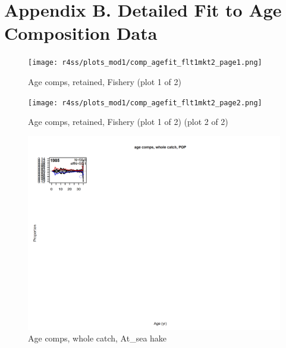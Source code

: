 \documentclass[12pt,]{article}
\begin{document}
\FloatBarrier

\section{Appendix B. Detailed Fit to Age Composition
Data}\label{appendix-b.-detailed-fit-to-age-composition-data}

\begin{figure}
\centering
\texttt{[image: r4ss/plots\_mod1/comp\_agefit\_flt1mkt2\_page1.png]}
\caption{Age comps, retained, Fishery (plot 1 of 2)
\label{fig:age_fits}}
\end{figure}

\begin{figure}
\centering
\texttt{[image: r4ss/plots\_mod1/comp\_agefit\_flt1mkt2\_page2.png]}
\caption{Age comps, retained, Fishery (plot 1 of 2) (plot 2 of 2)
\label{fig:age_fits}}
\end{figure}

\begin{figure}
\centering
\includegraphics{r4ss/plots_mod1/comp_agefit_flt2mkt0.png}
\caption{Age comps, whole catch, At\_sea hake \label{fig:age_fits}}
\end{figure}
\end{document}
